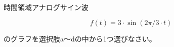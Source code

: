 時間領域アナログサイン波

\[
f(t) = 3 \cdot \sin( 2 \pi /3 \cdot t )
\]

\bigskip
\noindent  のグラフを選択肢a〜dの中から1つ選びなさい。
